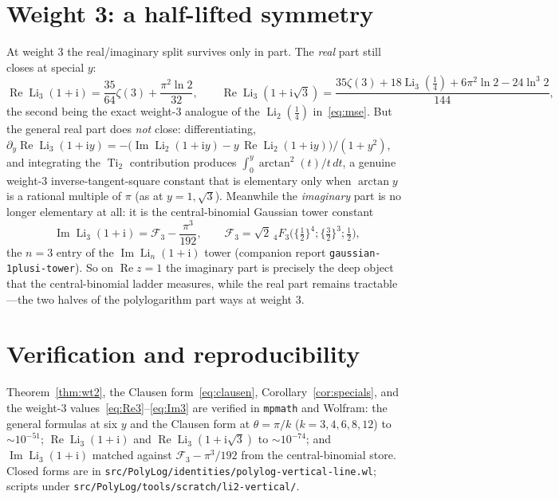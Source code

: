 \documentclass[11pt]{article}
\DeclareMathOperator{\Li}{Li}
\DeclareMathOperator{\Ti}{Ti}
\newcommand{\iu}{\mathrm{i}}
\newcommand{\Real}{\operatorname{Re}}
\newcommand{\Imag}{\operatorname{Im}}
\theoremstyle{plain}\newtheorem{theorem}{Theorem}\newtheorem{proposition}[theorem]{Proposition}
\theoremstyle{remark}\newtheorem{remark}[theorem]{Remark}
\begin{document}
\section{Weight 3: a half-lifted symmetry}
At weight $3$ the real/imaginary split survives only in part. The \emph{real} part still closes at special
$y$:
\begin{equation}\label{eq:Re3}
  \Real\Li_3(1+\iu)=\frac{35}{64}\zeta(3)+\frac{\pi^2\ln2}{32},\qquad
  \Real\Li_3(1+\iu\sqrt3)=\frac{35\zeta(3)+18\Li_3(\tfrac14)+6\pi^2\ln2-24\ln^3 2}{144},
\end{equation}
the second being the exact weight-3 analogue of the $\Li_2(\tfrac14)$ in~\eqref{eq:mse}. But the general
real part does \emph{not} close: differentiating, $\partial_y\Real\Li_3(1+\iu y)=-\bigl(\Imag\Li_2(1+\iu y)-y\,\Real\Li_2(1+\iu y)\bigr)/(1+y^2)$,
and integrating the $\Ti_2$ contribution produces $\int_0^y\arctan^2(t)/t\,dt$, a genuine weight-3
inverse-tangent-square constant that is elementary only when $\arctan y$ is a rational multiple of $\pi$
(as at $y=1,\sqrt3$). Meanwhile the \emph{imaginary} part is no longer elementary at all: it is the
central-binomial Gaussian tower constant
\begin{equation}\label{eq:Im3}
  \Imag\Li_3(1+\iu)=\mathcal F_3-\frac{\pi^3}{192},\qquad
  \mathcal F_3=\sqrt2\,{}_4F_3\bigl(\{\tfrac12\}^4;\{\tfrac32\}^3;\tfrac12\bigr),
\end{equation}
the $n=3$ entry of the $\Imag\Li_n(1+\iu)$ tower (companion report
\texttt{gaussian-1plusi-tower}). So on $\Real z=1$ the imaginary part is precisely the deep object that
the central-binomial ladder measures, while the real part remains tractable---the two halves of the
polylogarithm part ways at weight $3$.

\section{Verification and reproducibility}
Theorem~\ref{thm:wt2}, the Clausen form~\eqref{eq:clausen}, Corollary~\ref{cor:specials}, and the
weight-3 values~\eqref{eq:Re3}--\eqref{eq:Im3} are verified in \texttt{mpmath} and Wolfram: the general
formulas at six $y$ and the Clausen form at $\theta=\pi/k$ ($k=3,4,6,8,12$) to $\sim10^{-51}$;
$\Real\Li_3(1+\iu)$ and $\Real\Li_3(1+\iu\sqrt3)$ to $\sim10^{-74}$; and $\Imag\Li_3(1+\iu)$ matched
against $\mathcal F_3-\pi^3/192$ from the central-binomial store. Closed forms are in
\texttt{src/PolyLog/identities/polylog-vertical-line.wl}; scripts under
\texttt{src/PolyLog/tools/scratch/li2-vertical/}.
\end{document}
